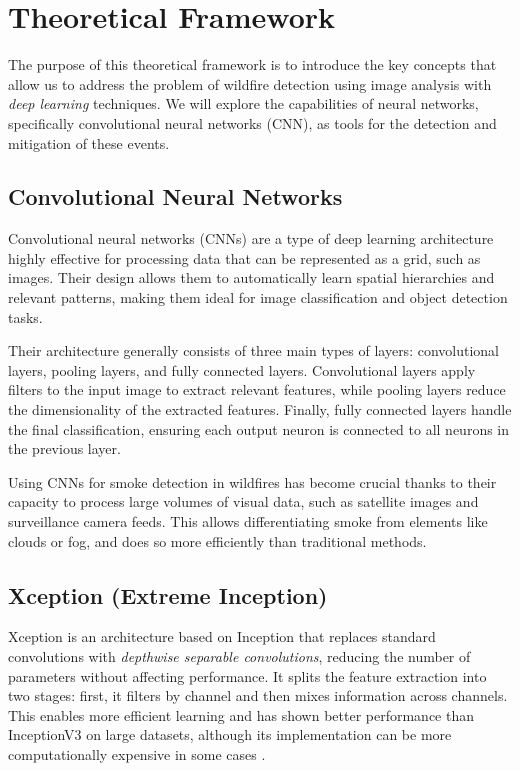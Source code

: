 \section{Theoretical Framework}
\label{sec:theoretical-framework}

The purpose of this theoretical framework is to introduce the key concepts that allow us
to address the problem of wildfire detection using image analysis with \textit{deep
learning} techniques.
We will explore the capabilities of neural networks, specifically convolutional neural networks (CNN),
as tools for the detection and mitigation of these events.

\subsection{Convolutional Neural Networks}
\label{subsec:cnn}

Convolutional neural networks (CNNs) are a type of deep learning architecture highly
effective for processing data that can be represented as a grid, such as images.
Their design allows them to automatically learn spatial hierarchies and relevant patterns,
making them ideal for image classification and object detection tasks.

Their architecture generally consists of three main types of layers: convolutional layers,
pooling layers, and fully connected layers.
Convolutional layers apply filters to the input image to extract relevant features,
while pooling layers reduce the dimensionality of the extracted features.
Finally, fully connected layers handle the final classification, ensuring each output neuron
is connected to all neurons in the previous layer.

Using CNNs for smoke detection in wildfires has become crucial thanks to their capacity
to process large volumes of visual data, such as satellite images and surveillance camera
feeds.
This allows differentiating smoke from elements like clouds or fog, and does so
more efficiently than traditional methods.

\subsection{Xception (Extreme Inception)}
\label{subsec:xception}

Xception is an architecture based on Inception that replaces standard convolutions with
\textit{depthwise separable convolutions}, reducing the number of parameters without
affecting performance.
It splits the feature extraction into two stages: first, it filters
by channel and then mixes information across channels.
This enables more efficient learning and has shown better performance than
InceptionV3 on large datasets, although its implementation can be more computationally expensive in some cases
\cite{sathishkumar_forest_2023}.

